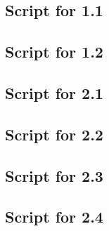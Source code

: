 	
	\subsection*{Script for 1.1} \label{matlab_1.1}
	
	\subsection*{Script for 1.2} \label{matlab_1.2}
	
	
	\subsection*{Script for 2.1} \label{matlab_2.1}
	
	\subsection*{Script for 2.2} \label{matlab_2.2}
	
	\subsection*{Script for 2.3} \label{matlab_2.3}
	
	\subsection*{Script for 2.4} \label{matlab_2.4}
	
	
